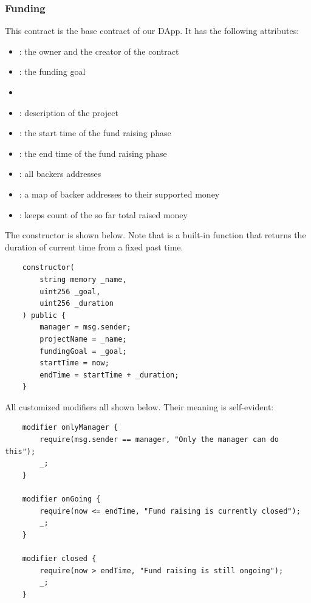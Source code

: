 \documentclass{article}
\begin{document}
\subsubsection{Funding}
This contract is the base contract of our DApp. It has the following attributes:
\begin{itemize}
    \item {}: the owner and the creator of the contract
    \item {}: the funding goal
    \item {}
    \item {}: description of the project
    \item {}: the start time of the fund raising phase
    \item {}: the end time of the fund raising phase
    \item {}: all backers addresses
    \item {}: a map of backer addresses to their supported money
    \item {}: keeps count of the so far total raised money
\end{itemize}

The constructor is shown below. Note that  is a built-in function that returns the duration of current time from a fixed past time.
\begin{lstlisting}
    constructor(
        string memory _name,
        uint256 _goal,
        uint256 _duration
    ) public {
        manager = msg.sender;
        projectName = _name;
        fundingGoal = _goal;
        startTime = now;
        endTime = startTime + _duration;
    }
\end{lstlisting}

All customized modifiers all shown below. Their meaning is self-evident:
\begin{lstlisting}
    modifier onlyManager {
        require(msg.sender == manager, "Only the manager can do this");
        _;
    }

    modifier onGoing {
        require(now <= endTime, "Fund raising is currently closed");
        _;
    }

    modifier closed {
        require(now > endTime, "Fund raising is still ongoing");
        _;
    }
\end{lstlisting}
\end{document}

